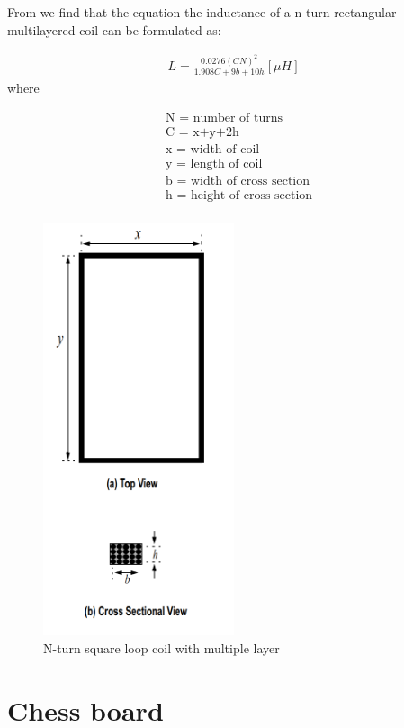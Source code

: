 From \cite{antennadesign} we find that the equation the inductance of a n-turn rectangular multilayered coil can be formulated as:

\begin{align}
    L=\frac{0.0276 (CN)^2}{1.908C +9b+10h} [\mu H]
\end{align}
where

\begin{align*}
    &\text{N = number of turns}\\
    &\text{C = x+y+2h}\\
    &\text{x = width of coil}\\
    &\text{y = length of coil}\\
    &\text{b = width of cross section}\\
    &\text{h = height of cross section}\\
\end{align*}

\begin{figure}[H]
    \centering
    \includegraphics[width=0.5\textwidth]{03_Theory/figures/coilAntenna.png}
    \caption{N-turn square loop coil with multiple layer}
    \label{fig:03:coilantenna}
\end{figure}


\section{Chess board}

